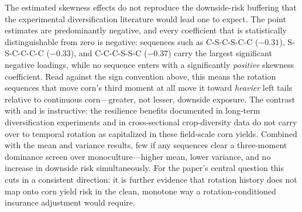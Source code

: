 \documentclass[12pt,letterpaper]{article}
\theoremstyle{remark}
\theoremstyle{remark}
\theoremstyle{plain}
\theoremstyle{definition}
\begin{document}
The estimated skewness effects do not reproduce the downside-risk buffering that the experimental diversification literature would lead one to expect. The point estimates are predominantly negative, and every coefficient that is statistically distinguishable from zero is negative: sequences such as C-S-C-S-C-C ($-0.31$), S-S-C-C-C-C ($-0.33$), and C-C-C-S-S-C ($-0.37$) carry the largest significant negative loadings, while no sequence enters with a significantly \emph{positive} skewness coefficient. Read against the sign convention above, this means the rotation sequences that move corn's third moment at all move it toward \emph{heavier} left tails relative to continuous corn---greater, not lesser, downside exposure. The contrast with \citet{bowles2020} and \citet{difalco2009} is instructive: the resilience benefits documented in long-term diversification experiments and in cross-sectional crop-diversity data do not carry over to temporal rotation as capitalized in these field-scale corn yields. Combined with the mean and variance results, few if any sequences clear a three-moment dominance screen over monoculture---higher mean, lower variance, and no increase in downside risk simultaneously. For the paper's central question this cuts in a consistent direction: it is further evidence that rotation history does not map onto corn yield risk in the clean, monotone way a rotation-conditioned insurance adjustment would require.
\end{document}
